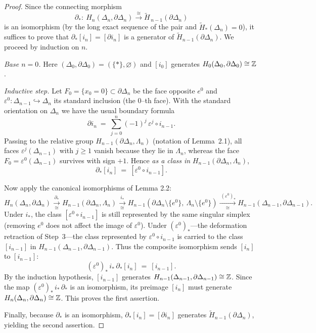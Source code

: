 \begin{proof}
Since the connecting morphism
\[
\partial_*:\ H_n(\Delta_n,\partial \Delta_n)\xrightarrow{\ \cong\ }
\widetilde H_{\,n-1}(\partial \Delta_n)
\]
is an isomorphism (by the long exact sequence of the pair and
$\widetilde H_*(\Delta_n)=0$), it suffices to prove that
$\partial_*[i_n]=[\partial i_n]$ is a generator of
$\widetilde H_{n-1}(\partial \Delta_n)$. We proceed by induction on $n$.

\smallskip
\emph{Base $n=0$.} Here $(\Delta_0,\partial \Delta_0)=(\{\ast\},\varnothing)$ and $[i_0]$
generates $H_0(\Delta_0,\partial \Delta_0)\cong\Bbb Z$.

\smallskip
\emph{Inductive step.}
Let $F_0=\{x_0=0\}\subset \partial \Delta_n$ be the face opposite $e^0$ and
$\varepsilon^0:\Delta_{n-1}\hookrightarrow \Delta_n$ its standard inclusion
(the $0$–th face). With the standard orientation on $\Delta_n$ we have the
usual boundary formula
\[
\partial i_n \ =\ \sum_{j=0}^{n}(-1)^j\,\varepsilon^j\circ i_{n-1}.
\]
Passing to the relative group $H_{n-1}(\partial \Delta_n,\Lambda_n)$ (notation of
Lemma~2.1), all faces $\varepsilon^j(\Delta_{n-1})$ with $j\ge1$ vanish
because they lie in $\Lambda_n$, whereas the face $F_0=\varepsilon^0(\Delta_{n-1})$
survives with sign $+1$. Hence \emph{as a class in}
$H_{n-1}(\partial \Delta_n,\Lambda_n)$,
\[
\partial_*[i_n]\ =\ [\varepsilon^0\circ i_{n-1}].
\tag{$\ast$}\label{eq:star}
\]

Now apply the canonical isomorphisms of Lemma 2.2:
\[
H_n(\Delta_n,\partial \Delta_n)\xrightarrow[\cong]{\ \partial_*\ }
H_{n-1}(\partial \Delta_n,\Lambda_n)
\xrightarrow[\cong]{\ i_*\ }
H_{n-1}(\partial \Delta_n\!\setminus\!\{e^0\},\ \Lambda_n\!\setminus\!\{e^0\})
\xrightarrow[\cong]{\ (\varepsilon^0)_* }
H_{n-1}(\Delta_{n-1},\partial \Delta_{n-1}).
\]
Under $i_*$, the class $[\varepsilon^0\circ i_{n-1}]$ is still represented by
the same singular simplex (removing $e^0$ does not affect the image of $\varepsilon^0$).
Under $(\varepsilon^0)_*$—the deformation retraction of Step~3—the class represented by
$\varepsilon^0\circ i_{n-1}$ is carried to the class $[i_{n-1}]$ in
$H_{n-1}(\Delta_{n-1},\partial \Delta_{n-1})$. Thus the composite isomorphism sends
$[i_n]$ to $[i_{n-1}]$:
\[
(\varepsilon^0)_*\, i_*\,\partial_*[i_n]\ =\ [i_{n-1}]. \tag{$\dagger$}
\]
By the induction hypothesis, $[i_{n-1}]$ generates
$H_{n-1}(\Delta_{n-1},\partial \Delta_{n-1})\cong\Bbb Z$. Since the map
$(\varepsilon^0)_*\, i_*\,\partial_*$ is an isomorphism, its preimage $[i_n]$
must generate $H_n(\Delta_n,\partial \Delta_n)\cong\Bbb Z$. This proves the first
assertion.

Finally, because $\partial_*$ is an isomorphism, $\partial_*[i_n]=[\partial i_n]$
generates $\widetilde H_{n-1}(\partial \Delta_n)$, yielding the second assertion.
\end{proof}

